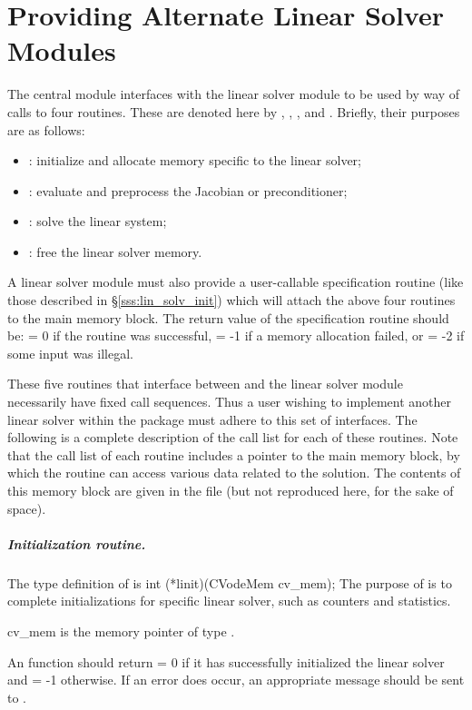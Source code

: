 \chapter{Providing Alternate Linear Solver Modules}\label{s:new_linsolv}
The central {\cvodes} module interfaces with the linear solver module to be
used by way of calls to four routines.  These are denoted here by 
, , , and .
Briefly, their purposes are as follows:
\begin{itemize}
\item {}: initialize and allocate memory specific to the
  linear solver;
\item {}: evaluate and preprocess the Jacobian or preconditioner;
\item {}: solve the linear system;
\item {}: free the linear solver memory.
\end{itemize}
A linear solver module must also provide a user-callable specification routine
(like those described in \S\ref{sss:lin_solv_init}) which will attach the above four 
routines to the main {\cvodes} memory block. The return value of the specification 
routine should be:  = 0 if the routine was successful,
 = -1 if a memory allocation failed, or  = -2
if some input was illegal.

These five routines that interface between {\cvodes} and the linear solver module
necessarily have fixed call sequences.  Thus a user wishing to implement another 
linear solver within the {\cvodes} package must adhere to this set of interfaces.
The following is a complete description of the call list for each of
these routines.  Note that the call list of each routine includes a
pointer to the main {\cvodes} memory block, by which the routine can access
various data related to the {\cvodes} solution.  The contents of this memory
block are given in the file  (but not reproduced here, for
the sake of space).


\paragraph{Initialization routine.}
The type definition of  is
{
  int (*linit)(CVodeMem cv\_mem);
}
{
  The purpose of  is to complete initializations for      
  specific linear solver, such as counters and statistics.        
}
{
  \begin{args}[cv\_mem]
  \item[cv\_mem]
    is the {\cvodes} memory pointer of type .
  \end{args}
}
{
  An  function should return  = 0 if it 
  has successfully initialized the {\cvodes} linear solver and 
   = -1 otherwise. 
}
{
  If an error does occur, an appropriate message should be sent 
  to .
}

